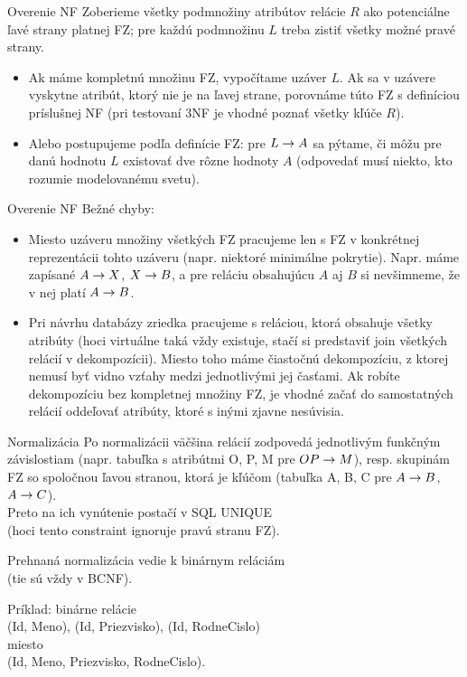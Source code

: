 \documentclass[12pt]{beamer}
\begin{document}
\begin{frame}[fragile]{Overenie NF}
Zoberieme všetky podmnožiny atribútov relácie $R$ ako potenciálne ľavé strany platnej FZ;
pre každú podmnožinu $L$ treba zistiť všetky možné pravé strany.
\begin{itemize}
\item Ak máme kompletnú množinu FZ, vypočítame uzáver $L$.
Ak sa v uzávere vyskytne atribút, ktorý nie je na ľavej strane, porovnáme túto FZ s definíciou príslušnej NF
(pri testovaní 3NF je vhodné poznať všetky kľúče $R$).

\item Alebo postupujeme podľa definície FZ: pre $L\rightarrow A$ sa pýtame,
či môžu pre danú hodnotu $L$ existovať dve rôzne hodnoty $A$
(odpovedať musí niekto, kto rozumie modelovanému svetu).
\end{itemize}
\end{frame}

\begin{frame}[fragile]{Overenie NF}
Bežné chyby:
\begin{itemize}
\item Miesto uzáveru množiny všetkých FZ pracujeme len s FZ v konkrétnej reprezentácii tohto uzáveru (napr. niektoré minimálne pokrytie).
Napr. máme zapísané $A\rightarrow X$, $X\rightarrow B$, a pre reláciu obsahujúcu $A$ aj $B$ si nevšimneme, že v nej platí $A\rightarrow B$.
\item Pri návrhu databázy zriedka pracujeme s reláciou, ktorá obsahuje všetky atribúty
(hoci virtuálne taká vždy existuje, stačí si predstaviť join všetkých relácií v dekompozícii).
Miesto toho máme čiastočnú dekompozíciu, z ktorej nemusí byť vidno vzťahy medzi jednotlivými jej časťami.
Ak robíte dekompozíciu bez kompletnej množiny FZ, je vhodné začať do samostatných relácií oddeľovať atribúty, ktoré s inými zjavne nesúvisia.
\end{itemize}
\end{frame}

\begin{frame}[fragile]{Normalizácia}
Po normalizácii väčšina relácií zodpovedá jednotlivým funkčným závislostiam (napr. tabuľka s atribútmi O, P, M pre $OP\rightarrow M$),
resp. skupinám FZ so spoločnou ľavou stranou, ktorá je kľúčom (tabuľka A, B, C pre $A\rightarrow B$, $A\rightarrow C$).\\
Preto na ich vynútenie postačí v SQL UNIQUE\\
(hoci tento constraint ignoruje pravú stranu FZ).
\bigskip

Prehnaná normalizácia vedie k binárnym reláciám\\
(tie sú vždy v BCNF).

\bigskip
Príklad: binárne relácie\\
(Id, Meno), (Id, Priezvisko), (Id, RodneCislo)\\
miesto\\
(Id, Meno, Priezvisko, RodneCislo).
\end{frame}
\end{document}
